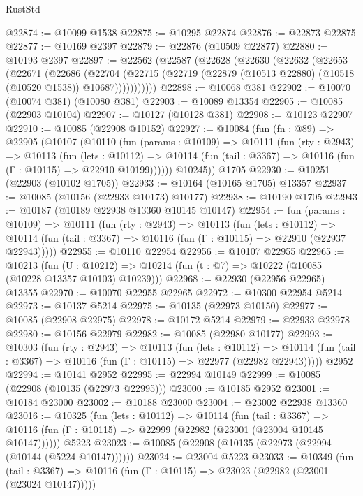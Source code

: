 \begin{lexlean}{RustStd}
\begin{coremodule}
@22874 := @10099 @1538
@22875 := @10295 @22874
@22876 := @22873 @22875
@22877 := @10169 @2397
@22879 := @22876 (@10509 @22877)
@22880 := @10193 @2397
@22897 := @22562
    (@22587
      (@22628
        (@22630
          (@22632
            (@22653
              (@22671
                (@22686
                  (@22704
                    (@22715
                      (@22719 (@22879 (@10513 @22880) (@10518 (@10520 @1538)) @10687)))))))))))
@22898 := @10068 @381
@22902 := @10070 (@10074 @381) (@10080 @381)
@22903 := @10089 @13354
@22905 := @10085 (@22903 @10104)
@22907 := @10127 (@10128 @381)
@22908 := @10123 @22907
@22910 := @10085 (@22908 @10152)
@22927 := @10084
    (fun (fn : @89) =>
    @22905
      (@10107
        (@10110
          (fun (params : @10109) =>
          @10111
            (fun (rty : @2943) =>
            @10113
              (fun (lets : @10112) =>
              @10114 (fun (tail : @3367) => @10116 (fun (Γ : @10115) => @22910 @10199))))))
        @10245))
    @1705
@22930 := @10251 (@22903 (@10102 @1705))
@22933 := @10164 (@10165 @1705) @13357
@22937 := @10085 (@10156 (@22933 @10173) @10177)
@22938 := @10190 @1705
@22943 := @10187 (@10189 @22938 @13360 @10145 @10147)
@22954 := fun (params : @10109) =>
  @10111
    (fun (rty : @2943) =>
    @10113
      (fun (lets : @10112) =>
      @10114 (fun (tail : @3367) => @10116 (fun (Γ : @10115) => @22910 (@22937 @22943)))))
@22955 := @10110 @22954
@22956 := @10107 @22955
@22965 := @10213
    (fun (U : @10212) => @10214 (fun (t : @7) => @10222 (@10085 (@10228 @13357 @10103) @10239)))
@22968 := @22930 (@22956 @22965) @13355
@22970 := @10070 @22955 @22965
@22972 := @10300 @22954 @5214
@22973 := @10137 @5214
@22975 := @10135 (@22973 @10150)
@22977 := @10085 (@22908 @22975)
@22978 := @10172 @5214
@22979 := @22933 @22978
@22980 := @10156 @22979
@22982 := @10085 (@22980 @10177)
@22993 := @10303
    (fun (rty : @2943) =>
    @10113
      (fun (lets : @10112) =>
      @10114 (fun (tail : @3367) => @10116 (fun (Γ : @10115) => @22977 (@22982 @22943)))))
    @2952
@22994 := @10141 @2952
@22995 := @22994 @10149
@22999 := @10085 (@22908 (@10135 (@22973 @22995)))
@23000 := @10185 @2952
@23001 := @10184 @23000
@23002 := @10188 @23000
@23004 := @23002 @22938 @13360
@23016 := @10325
    (fun (lets : @10112) =>
    @10114
      (fun (tail : @3367) =>
      @10116 (fun (Γ : @10115) => @22999 (@22982 (@23001 (@23004 @10145 @10147))))))
    @5223
@23023 := @10085 (@22908 (@10135 (@22973 (@22994 (@10144 (@5224 @10147))))))
@23024 := @23004 @5223
@23033 := @10349
    (fun (tail : @3367) => @10116 (fun (Γ : @10115) => @23023 (@22982 (@23001 (@23024 @10147)))))

\end{coremodule}
\end{lexlean}
